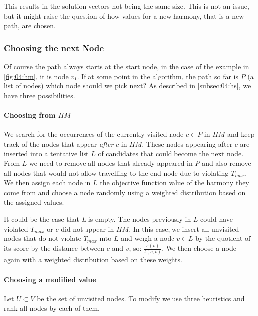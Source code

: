 This results in the solution vectors not being the same size.
This is not an issue, but it might raise the question of how values for a new harmony, that is a new path, are chosen.

\subsubsection{Choosing the next Node}

Of course the path always starts at the start node, in the case of the example in \cref{fig:04:hm}, it is node $v_1$.
If at some point in the algorithm, the path so far is $P$ (a list of nodes) which node should we pick next?
As described in \cref{subsec:04:hs}, we have three possibilities.

\paragraph{Choosing from $HM$}

We search for the occurrences of the currently visited node $c \in P$ in $HM$ and keep track of the nodes that appear \emph{after} $c$ in $HM$.
These nodes appearing after $c$ are inserted into a tentative list $L$ of candidates that could become the next node.
From $L$ we need to remove all nodes that already appeared in $P$ and also remove all nodes that would not allow travelling to the end node due to violating $T_{max}$.
We then assign each node in $L$ the objective function value of the harmony they come from and choose a node randomly using a weighted distribution based on the assigned values.

It could be the case that $L$ is empty. The nodes previously in $L$ could have violated $T_{max}$ or $c$ did not appear in $HM$.
In this case, we insert all unvisited nodes that do not violate $T_{max}$ into $L$ and weigh a node $v \in L$ by the quotient of its score by the distance between $c$ and $v$, so: $\tfrac{s(v)}{t(c, v)}$.
We then choose a node again with a weighted distribution based on these weights.

\label{par:04:choosemodified}
\paragraph{Choosing a modified value}

Let $U \subset V$ be the set of unvisited nodes.
To modify we use three heuristics and rank all nodes by each of them.

